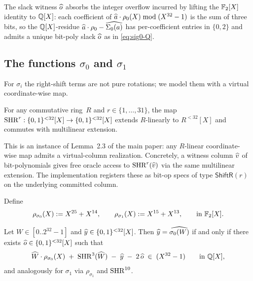 The slack witness $\widehat{o}$ absorbs the integer overflow incurred by
lifting the $\mathbb{F}_2[X]$ identity to $\mathbb{Q}[X]$: each coefficient of
$\widehat{a}\cdot\rho_0(X) \bmod (X^{32}-1)$ is the sum of three bits, so the
$\mathbb{Q}[X]$-residue $\widehat{a}\cdot\rho_0 - \widehat{\Sigma_0(a)}$ has
per-coefficient entries in $\{0,2\}$ and admits a unique bit-poly slack
$\widehat{o}$ as in \eqref{eq:sig0-Q}.

\subsection{The functions $\sigma_0$ and $\sigma_1$}\label{sec:small-sigma}

For $\sigma_i$ the right-shift terms are not pure rotations; we model
them with a virtual coordinate-wise map.

\begin{lemma}\label{lem:shr-virtual}
For any commutative ring~$R$ and $r \in \{1,\dots,31\}$, the map
$\operatorname{SHR}^r: \{0,1\}^{<32}[X] \to \{0,1\}^{<32}[X]$ extends $R$-linearly to
$R^{<32}[X]$ and commutes with multilinear extension.
\end{lemma}

This is an instance of Lemma~2.3 of the main paper: any $R$-linear
coordinate-wise map admits a virtual-column realization.
Concretely, a witness column $\widehat{v}$ of bit-polynomials gives free
oracle access to $\operatorname{SHR}^r(\widehat{v})$ via the same multilinear extension.
The implementation registers these as bit-op specs of type
$\mathsf{ShiftR}(r)$ on the underlying committed column.

Define
\begin{equation}\label{eq:rho-sigma}
\rho_{\sigma_0}(X) := X^{25} + X^{14}, \qquad
\rho_{\sigma_1}(X) := X^{15} + X^{13}, \qquad \text{in } \mathbb{F}_2[X].
\end{equation}

\begin{lemma}\label{lem:small-sigma}
Let $W \in [0\mathbin{..}2^{32}-1]$ and $\widehat{y} \in \{0,1\}^{<32}[X]$.
Then $\widehat{y} = \widehat{\sigma_0(W)}$ if and only if there exists
$\widehat{o} \in \{0,1\}^{<32}[X]$ such that
\begin{equation}\label{eq:lsig0-Q}
\widehat{W} \cdot \rho_{\sigma_0}(X) \;+\; \operatorname{SHR}^{3}(\widehat{W}) \;-\; \widehat{y} \;-\; 2\,\widehat{o}
\;\in\; (X^{32}-1) \qquad \text{in } \mathbb{Q}[X],
\end{equation}
and analogously for $\sigma_1$ via $\rho_{\sigma_1}$ and $\operatorname{SHR}^{10}$.
\end{lemma}

